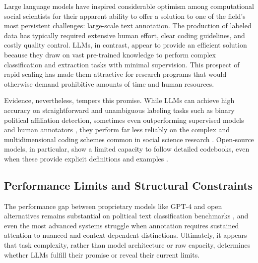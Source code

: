 \documentclass[12pt]{article}
\begin{document}
Large language models have inspired considerable optimism among computational social scientists for their apparent ability to offer a solution to one of the field’s most persistent challenges: large-scale text annotation. The production of labeled data has typically required extensive human effort, clear coding guidelines, and costly quality control. LLMs, in contrast, appear to provide an efficient solution because they draw on vast pre-trained knowledge to perform complex classification and extraction tasks with minimal supervision. This prospect of rapid scaling has made them attractive for research programs that would otherwise demand prohibitive amounts of time and human resources.

Evidence, nevertheless, tempers this promise. While LLMs can achieve high accuracy on straightforward and unambiguous labeling tasks such as binary political affiliation detection, sometimes even outperforming supervised models and human annotators \parencite{tornberg24a, gilardi_etal23}, they perform far less reliably on the complex and multidimensional coding schemes common in social science research \parencite{halterman_keith25, alizadeh_etal24a}. Open-source models, in particular, show a limited capacity to follow detailed codebooks, even when these provide explicit definitions and examples \parencite{halterman_keith25}. 

\subsection{Performance Limits and Structural Constraints}

The performance gap between proprietary models like GPT-4 and open alternatives remains substantial on political text classification benchmarks \parencite{alizadeh_etal24a}, and even the most advanced systems struggle when annotation requires sustained attention to nuanced and context-dependent distinctions. Ultimately, it appears that task complexity, rather than model architecture or raw capacity, determines whether LLMs fulfill their promise or reveal their current limits.
\end{document}
